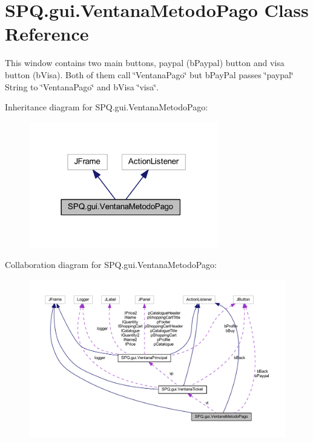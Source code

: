 \hypertarget{class_s_p_q_1_1gui_1_1_ventana_metodo_pago}{}\section{S\+P\+Q.\+gui.\+Ventana\+Metodo\+Pago Class Reference}
\label{class_s_p_q_1_1gui_1_1_ventana_metodo_pago}


This window contains two main buttons, paypal (b\+Paypal) button and visa button (b\+Visa). Both of them call \char`\"{}\+Ventana\+Pago\char`\"{} but b\+Pay\+Pal passes \char`\"{}paypal\char`\"{} String to \char`\"{}\+Ventana\+Pago\char`\"{} and b\+Visa \char`\"{}visa\char`\"{}.  




Inheritance diagram for S\+P\+Q.\+gui.\+Ventana\+Metodo\+Pago\+:
\nopagebreak
\begin{figure}[H]
\begin{center}
\leavevmode
\includegraphics[width=234pt]{class_s_p_q_1_1gui_1_1_ventana_metodo_pago__inherit__graph}
\end{center}
\end{figure}


Collaboration diagram for S\+P\+Q.\+gui.\+Ventana\+Metodo\+Pago\+:
\nopagebreak
\begin{figure}[H]
\begin{center}
\leavevmode
\includegraphics[width=350pt]{class_s_p_q_1_1gui_1_1_ventana_metodo_pago__coll__graph}
\end{center}
\end{figure}
